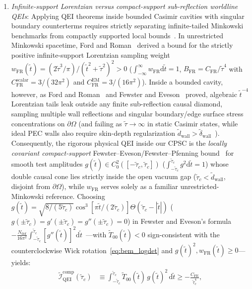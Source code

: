 \documentclass[aps,prd,twocolumn,10pt,showkeys,nofootinbib,floatfix,longbibliography]{revtex4-2}
\newcommand{\dd}{\mathrm{d}}
\begin{document}
\begin{enumerate}
\item \emph{Infinite-support Lorentzian versus compact-support sub-reflection worldline QEIs}: Applying QEI theorems inside bounded Casimir cavities with singular boundary counterterms requires strictly separating infinite-tailed Minkowski benchmarks from compactly supported local bounds~\cite{ford1995,ford1997,fewster1998,fewster2006jmp,fewster2012}. In unrestricted Minkowski spacetime, Ford and Roman~\cite{ford1995} derived a bound for the strictly positive infinite-support Lorentzian sampling weight $w_{\mathrm{FR}}(\tilde{t}) = (2\tilde{\tau}^3/\pi)/(\tilde{t}^2 + \tilde{\tau}^2)^2 > 0$ ($\int_{-\infty}^\infty w_{\mathrm{FR}}\dd\tilde{t} = 1$, $B_{\mathrm{FR}} = C_{\mathrm{FR}}/\tilde{\tau}^4$ with $C_{\mathrm{FR}}^{\mathrm{scalar}} = 3/(32\pi^2)$ and $C_{\mathrm{FR}}^{\mathrm{EM}} = 3/(16\pi^2)$). Inside a bounded cavity, however, as Ford and Roman~\cite{ford1997} and Fewster and Eveson~\cite{fewster1998} proved, algebraic $\tilde{t}^{-4}$ Lorentzian tails leak outside any finite sub-reflection causal diamond, sampling multiple wall reflections and singular boundary/edge surface stress concentrations on $\partial\Omega$ (and failing as $\tilde{\tau}\to\infty$ in static Casimir states, while ideal PEC walls also require skin-depth regularization $\tilde{d}_{\mathrm{wall}} > \tilde{\delta}_{\mathrm{wall}}$~\cite{deutsch1979,graham2003}). Consequently, the rigorous physical QEI inside our CPSC is the \emph{locally covariant compact-support} Fewster--Eveson/Fewster--Pfenning bound~\cite{fewster1998,fewster2006jmp,fewster2012} for smooth test amplitudes $g(\tilde{t}) \in C^2_0([-\tilde{\tau}_c, \tilde{\tau}_c])$ ($\int_{-\tilde{\tau}_c}^{\tilde{\tau}_c} g^2\dd\tilde{t} = 1$) whose double causal cone lies strictly inside the open vacuum gap ($\tilde{\tau}_c < \tilde{d}_{\mathrm{wall}}$, disjoint from $\partial\Omega$), while $w_{\mathrm{FR}}$ serves solely as a familiar unrestricted-Minkowski reference. Choosing $g(\tilde{t}) = \sqrt{8/(5\tilde{\tau}_c)}\cos^3[\pi\tilde{t}/(2\tilde{\tau}_c)]\Theta(\tilde{\tau}_c - |\tilde{t}|)$ ($g(\pm\tilde{\tau}_c) = g'(\pm\tilde{\tau}_c) = g''(\pm\tilde{\tau}_c) = 0$) in Fewster and Eveson's formula $-\frac{N_{\mathrm{dof}}}{16\pi^2}\int_{-\tilde{\tau}_c}^{\tilde{\tau}_c}[g''(\tilde{t})]^2\dd\tilde{t}$~\cite{fewster1998}---with $\tilde{T}_{00}(\tilde{t}) < 0$ sign-consistent with the counterclockwise Wick rotation~\eqref{eq:bem_logdet} and $g(\tilde{t})^2, w_{\mathrm{FR}}(\tilde{t}) \ge 0$---yields:
\begin{align}
\tilde{\mathcal{I}}_{\mathrm{QEI}}^{\mathrm{comp}}(\tilde{\tau}_c) &\equiv \int_{-\tilde{\tau}_c}^{\tilde{\tau}_c} \tilde{T}_{00}(\tilde{t})\,g(\tilde{t})^2\,\dd\tilde{t} \ge -\frac{C_{\mathrm{FE}}}{\tilde{\tau}_c^4}, \nonumber\\

\end{align}
\end{enumerate}
\end{document}
